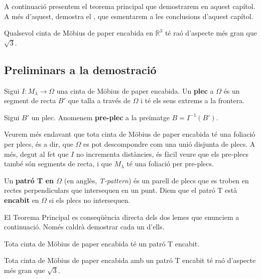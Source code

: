 A continuació presentem el teorema principal que demostrarem en aquest capítol. A més d'aquest, \citet{schwartz2024} demostra el , que esmentarem a les conclusions d'aquest capítol. 
\begin{teo}\label{teo:Main Schwartz}
    Qualsevol cinta de Möbius de paper encabida en $\mathbb R^3$ té raó d'aspecte més gran que $\sqrt{3}$.
\end{teo}




\subsection{Preliminars a la demostració}
\begin{defi}
    Sigui $I:M_\lambda\to\Omega$ una cinta de Möbius de paper encabida. Un \textbf{plec} a $\Omega$ és un segment de recta $B'$ que talla a través de $\Omega$ i té els seus extrems a la frontera.
\end{defi}

\begin{defi}
    Sigui $B'$ un plec. Anomenem \textbf{pre-plec} a la preimatge $B=I^{-1}(B')$.
\end{defi}
Veurem més endavant que tota cinta de Möbius de paper encabida té una foliació per plecs, és a dir, que $\Omega$ es pot descompondre com una unió disjunta de plecs. A més, degut al fet que $I$ no incrementa distàncies, és fàcil veure que els pre-plecs també són segments de recta, i que $M_\lambda$ té una foliació per pre-plecs.
\begin{defi}
    Un \textbf{patró T en $\Omega$} (en anglès, \textit{T-pattern}) és un parell de plecs que es troben en rectes perpendiculars que intersequen en un punt. Diem que el patró T està \textbf{encabit} en $\Omega$ si els plecs no intersequen.
\end{defi}

El Teorema Principal es conseqüència directa dels dos lemes que enunciem a continuació. Només caldrà demostrar cada un d'ells.
\begin{lema}[\textbf{T}]\label{lema T}
    Tota cinta de Möbius de paper encabida té un patró T encabit.
\end{lema}

\begin{lema}[\textbf{G}]\label{lema G}
    Tota cinta de Möbius de paper encabida amb un patró T encabit té raó d'aspecte més gran que $\sqrt{3}$.
\end{lema}


